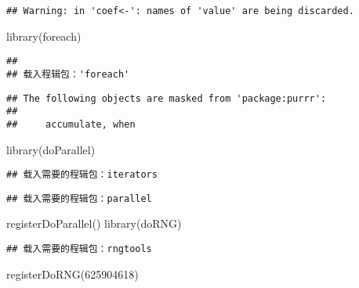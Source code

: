 \documentclass[
]{article}
\newenvironment{Shaded}{\begin{snugshade}}{\end{snugshade}}
\newcommand{\DecValTok}[1]{\textcolor[rgb]{0.00,0.00,0.81}{#1}}
\newcommand{\FunctionTok}[1]{\textcolor[rgb]{0.00,0.00,0.00}{#1}}
\newcommand{\NormalTok}[1]{#1}
\begin{document}
\begin{verbatim}
## Warning: in 'coef<-': names of 'value' are being discarded.
\end{verbatim}

\begin{Shaded}
\begin{Highlighting}[]
\FunctionTok{library}\NormalTok{(foreach)}
\end{Highlighting}
\end{Shaded}

\begin{verbatim}
## 
## 载入程辑包：'foreach'
\end{verbatim}

\begin{verbatim}
## The following objects are masked from 'package:purrr':
## 
##     accumulate, when
\end{verbatim}

\begin{Shaded}
\begin{Highlighting}[]
\FunctionTok{library}\NormalTok{(doParallel)}
\end{Highlighting}
\end{Shaded}

\begin{verbatim}
## 载入需要的程辑包：iterators
\end{verbatim}

\begin{verbatim}
## 载入需要的程辑包：parallel
\end{verbatim}

\begin{Shaded}
\begin{Highlighting}[]
\FunctionTok{registerDoParallel}\NormalTok{()}
\FunctionTok{library}\NormalTok{(doRNG)}
\end{Highlighting}
\end{Shaded}

\begin{verbatim}
## 载入需要的程辑包：rngtools
\end{verbatim}

\begin{Shaded}
\begin{Highlighting}[]
\FunctionTok{registerDoRNG}\NormalTok{(}\DecValTok{625904618}\NormalTok{)}
\end{Highlighting}
\end{Shaded}
\end{document}
